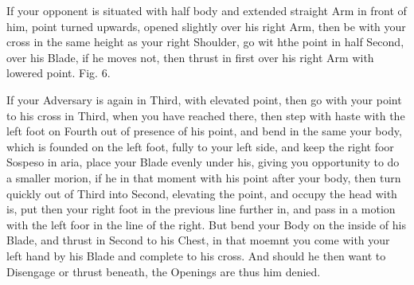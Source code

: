 \newpage


\newpage




\exercise{}
If your opponent is situated with half body and extended straight Arm
in front of him, point turned upwards, opened slightly over his right
Arm, then be with your cross in the same height as your right
Shoulder, go wit hthe point in half Second, over his Blade, if he
moves not, then thrust in first over his right Arm with lowered
point. Fig. 6.


\exercise{}
If your Adversary is again in Third, with elevated point, then go with
your point to his cross in Third, when you have reached there, then
step with haste with the left foot on Fourth out of presence of his
point, and bend in the same your body,
which is founded on the left foot, fully to your left side, and keep
the right foor Sospeso in aria, place your Blade evenly under his,
giving you opportunity to do a smaller morion, if
he in that moment with his point after your body, then turn quickly
out of Third into Second, elevating the point, and occupy the head
with is, put then your right foot in the previous line further in, and
pass in a motion with the left foor in the line of the right.
But bend your Body on the inside of his Blade, and thrust in Second to
his Chest, in that moemnt you come with your left hand by his Blade
and complete to his cross. And should he then want to Disengage or
thrust beneath, the Openings are thus him denied.
